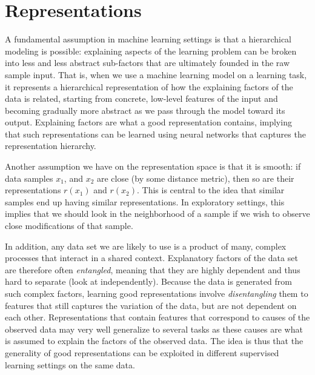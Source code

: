 
\section{Representations}
A fundamental assumption in machine learning settings is that a hierarchical modeling is possible: explaining aspects of the learning problem can be broken into less and less abstract sub-factors that are ultimately founded in the raw sample input. That is, when we use a machine learning model on a learning task, it represents a hierarchical representation of how the explaining factors of the data is related, starting from concrete, low-level features of the input and becoming gradually more abstract as we pass through the model toward its output. Explaining factors are what a good representation contains, implying that such representations can be learned using neural networks that captures the representation hierarchy.

Another assumption we have on the representation space is that it is smooth: if data samples $x_1$, and $x_2$ are close (by some distance metric), then so are their representations $r(x_1)$ and $r(x_2)$. This is central to the idea that similar samples end up having similar representations. In exploratory settings, this implies that we should look in the neighborhood of a sample if we wish to observe close modifications of that sample.

In addition, any data set we are likely to use is a product of many, complex processes that interact in a shared context. Explanatory factors of the data set are therefore often \textit{entangled}, meaning that they are highly dependent and thus hard to separate (look at independently). Because the data is generated from such complex factors, learning good representations involve \textit{disentangling} them to features that still captures the variation of the data, but are not dependent on each other. Representations that contain features that correspond to causes of the observed data may very well generalize to several tasks as these causes are what is assumed to explain the factors of the observed data. The idea is thus that the generality of good representations can be exploited in different supervised learning settings on the same data.

